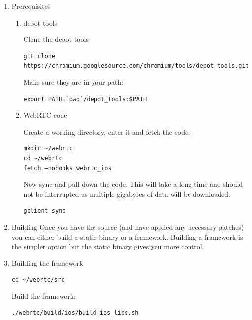 \documentclass[a4paper,11pt]{article}
\begin{document}
\begin{enumerate}
\item Prerequisites
\label{sec:orgheadline42}
\begin{enumerate}
\item depot tools
\label{sec:orgheadline40}

Clone the depot tools

\begin{verbatim}
git clone https://chromium.googlesource.com/chromium/tools/depot_tools.git
\end{verbatim}

Make sure they are in your path:

\begin{verbatim}
export PATH=`pwd`/depot_tools:$PATH
\end{verbatim}

\item WebRTC code
\label{sec:orgheadline41}

Create a working directory, enter it and fetch the code:

\begin{verbatim}
mkdir ~/webrtc
cd ~/webrtc
fetch —nohooks webrtc_ios
\end{verbatim}

Now sync and pull down the code.  This will take a long time and
should not be interrupted as multiple gigabytes of data will be
downloaded.

\begin{verbatim}
gclient sync
\end{verbatim}
\end{enumerate}

\item Building
\label{sec:orgheadline43}
\label{orgtarget10} Once you have the source (and have applied any
necessary patches) you can either build a static binary or a
framework.  Building a framework is the simpler option but the static
binary gives you more control.


\item Building the framework
\label{sec:orgheadline44}

\begin{verbatim}
cd ~/webrtc/src
\end{verbatim}

Build the framework:

\begin{verbatim}
./webrtc/build/ios/build_ios_libs.sh
\end{verbatim}


\end{enumerate}
\end{document}
